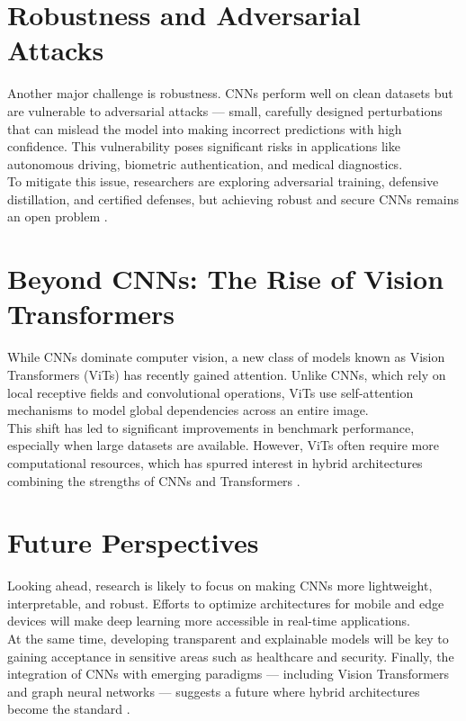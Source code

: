 \section{Robustness and Adversarial Attacks}

Another major challenge is robustness. CNNs perform well on clean datasets but are vulnerable to adversarial attacks — small, carefully designed perturbations that can mislead the model into making incorrect predictions with high confidence.  
This vulnerability poses significant risks in applications like autonomous driving, biometric authentication, and medical diagnostics.  
\\
To mitigate this issue, researchers are exploring adversarial training, defensive distillation, and certified defenses, but achieving robust and secure CNNs remains an open problem \cite{zhao2024review}.

\section{Beyond CNNs: The Rise of Vision Transformers}

While CNNs dominate computer vision, a new class of models known as Vision Transformers (ViTs) has recently gained attention.  
Unlike CNNs, which rely on local receptive fields and convolutional operations, ViTs use self-attention mechanisms to model global dependencies across an entire image.  
\\
This shift has led to significant improvements in benchmark performance, especially when large datasets are available.  
However, ViTs often require more computational resources, which has spurred interest in hybrid architectures combining the strengths of CNNs and Transformers \cite{zhao2024review}.

\section{Future Perspectives}

Looking ahead, research is likely to focus on making CNNs more lightweight, interpretable, and robust.  
Efforts to optimize architectures for mobile and edge devices will make deep learning more accessible in real-time applications.  
\\
At the same time, developing transparent and explainable models will be key to gaining acceptance in sensitive areas such as healthcare and security.  
Finally, the integration of CNNs with emerging paradigms — including Vision Transformers and graph neural networks — suggests a future where hybrid architectures become the standard \cite{li2021survey, zhao2024review}.